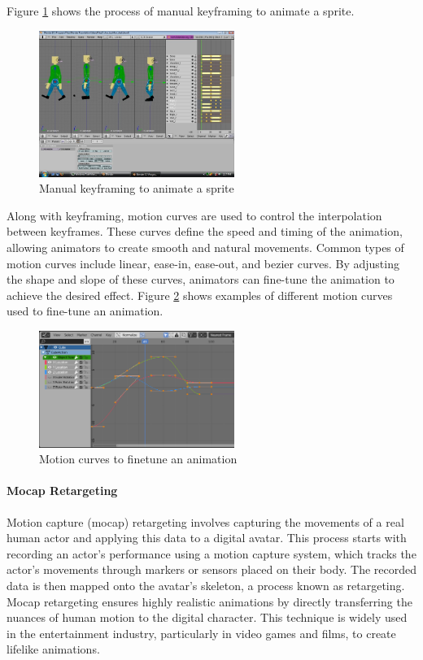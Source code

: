 \documentclass[../../main.tex]{subfiles}
\begin{document}
Figure \ref{fig:keyframing} shows the process of manual keyframing to animate a sprite.

\begin{figure} 
  \centering \includegraphics[width = 2.5in]{chapters/background_work/images/keyframing.png} 
  \caption{Manual keyframing to animate a sprite} 
  \label{fig:keyframing} 
\end{figure}

Along with keyframing, motion curves\cite{0.1145/218380.218422} are used to control the interpolation between keyframes. These curves define the speed and timing of the animation, allowing animators to create smooth and natural movements. Common types of motion curves include linear, ease-in, ease-out, and bezier curves. By adjusting the shape and slope of these curves, animators can fine-tune the animation to achieve the desired effect. Figure \ref{fig:motion_curves} shows examples of different motion curves used to fine-tune an animation.

\begin{figure} 
  \centering \includegraphics[width = 2.5in]{chapters/background_work/images/motion_curves.png} 
  \caption{Motion curves to finetune an animation} 
  \label{fig:motion_curves} 
\end{figure}

\paragraph{Mocap Retargeting}
\label{par:mocap_retargeting}

Motion capture (mocap) retargeting involves capturing the movements of a real human actor and applying this data to a digital avatar. This process starts with recording an actor’s performance using a motion capture system, which tracks the actor’s movements through markers or sensors placed on their body. The recorded data is then mapped onto the avatar’s skeleton, a process known as retargeting. Mocap retargeting ensures highly realistic animations by directly transferring the nuances of human motion to the digital character. This technique is widely used in the entertainment industry, particularly in video games and films, to create lifelike animations.
\end{document}
